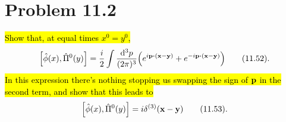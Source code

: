 \documentclass{article}
\begin{document}
\section*{Problem 11.2}
\begin{quoting}
    \hl{Show that, at equal times $x^0=y^0$,}\[\bqty{\hat{\phi}(x),\hat{\Pi}^0(y)}=\frac{i}{2}\int\frac{\dd[3]{p}}{(2\pi)^3}\pqty{e^{i\vb{p\vdot(\vb{x}-\vb{y})}}+e^{-i\vb{p\vdot(\vb{x}-\vb{y})}}}\qquad(11.52).\]\hl{In this expression there's nothing stopping us swapping the sign of $\vb{p}$ in the second term, and show that this leads to}\[\bqty{\hat{\phi}(x),\hat{\Pi}^0(y)}=i\delta^{(3)}(\vb{x}-\vb{y})\qquad(11.53).\]
\end{quoting}
\end{document}
